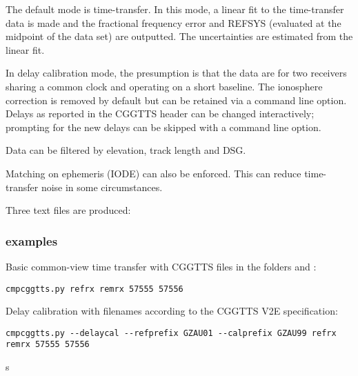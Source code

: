 The default mode is time-transfer. In this mode, a linear fit to the time-transfer data is made and the 
fractional frequency error and REFSYS (evaluated at the midpoint of the data set) are outputted. 
The uncertainties are estimated from the linear fit.

In delay calibration mode, the presumption is that the data are for two receivers sharing a
common clock and operating on a short baseline. The ionosphere correction is removed by default
but can be retained via a command line option. Delays as reported in the CGGTTS header can be 
changed interactively; prompting for the new delays can be skipped with a command line option.


Data can be filtered by elevation, track length and DSG.

Matching on ephemeris (IODE) can also be enforced. This can reduce time-transfer noise in
some circumstances.

Three text files are produced:

\subsubsection{examples}

Basic common-view time transfer with CGGTTS files in the folders  and :
\begin{lstlisting}[mathescape=true]
cmpcggtts.py refrx remrx 57555 57556
\end{lstlisting}

Delay calibration with filenames according to the CGGTTS V2E specification:
\begin{lstlisting}[mathescape=true]
cmpcggtts.py --delaycal --refprefix GZAU01 --calprefix GZAU99 refrx remrx 57555 57556
\end{lstlisting}
s






